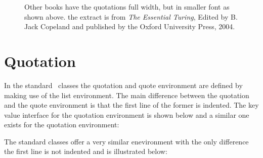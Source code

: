 \begin{figure}[p]
\centering
{}
\caption[Sample quotation.]{Other books have the quotations full width, but in smaller font as shown above. the extract is from \textit{The Essential Turing}, Edited by B. Jack Copeland and  published by the Oxford University Press, 2004. }
\label{fullwidthquotation}
\end{figure}


\section{Quotation}

In the standard \LaTeXe\ classes the quotation and quote environment are defined by making use of the list environment. The main difference between the quotation and the quote environment is that the first line of the former is indented. The key value interface for the quotation environment is shown below and a similar one exists for the quotation environment:



\begin{latexquotation}
\lipsum[1]
\end{latexquotation}

The standard classes offer a very similar enevironment with the only difference the first line is not indented and is illustrated below:

\begin{quote}
\lipsum[1]
\end{quote}


